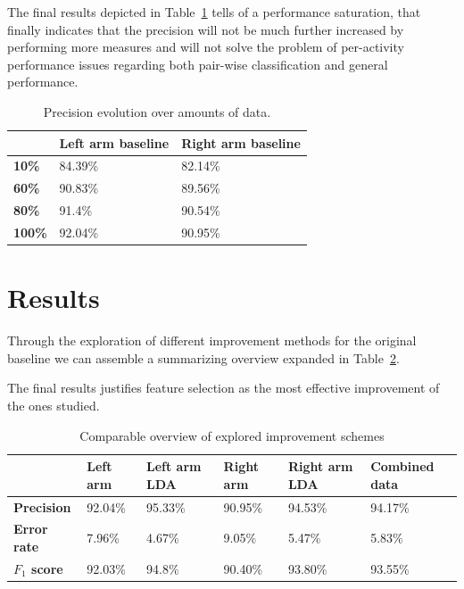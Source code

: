 \documentclass{sig-alternate}
\begin{document}
The final results depicted in Table~\ref{tab:evo_prec} tells of a performance saturation, that finally indicates that the precision will not be much further increased by performing more measures and will not solve the problem of per-activity performance issues regarding both pair-wise classification and general performance.

\begin{table}[t]
\centering
\caption{Precision evolution over amounts of data.}
\begin{tabular}{|l|l|l|}
\hline
           					&\textbf{Left arm baseline} 	&\textbf{Right arm baseline}		\\ \hline
\textbf{10\%}  				& 84.39\% 		 				& 82.14\%							\\ \hline
\textbf{60\%} 				& 90.83\%		 				& 89.56\%							\\ \hline
\textbf{80\%}  				& 91.4\%		 				& 90.54\%							\\ \hline
\textbf{100\%}  			& 92.04\% 		 				& 90.95\%							\\ \hline

\end{tabular}
\label{tab:evo_prec}
\end{table}


\section{Results}
Through the exploration of different improvement methods for the original baseline we can assemble a summarizing overview expanded in Table~\ref{tab:results}.

The final results justifies feature selection as the most effective improvement of the ones studied.

\begin{table}[bp]
\centering
\caption{Comparable overview of explored improvement schemes}
\begin{tabular}{|l|l|l|l|l|l|}
\hline
           							&\textbf{Left arm} 			&\textbf{Left arm LDA}		&\textbf{Right arm}		&\textbf{Right arm LDA}		&\textbf{Combined data}	\\ \hline
\textbf{Precision}  				& 92.04\% 		 			& 95.33\%					& 90.95\%				& 94.53\%					& 94.17\%				\\ \hline
\textbf{Error rate} 				& 7.96\%		 			& 4.67\%					& 9.05\%				& 5.47\%					& 5.83\%				\\ \hline
\textbf{$F_{1}$ score}  			& 92.03\%		 			& 94.8\%					& 90.40\%				& 93.80\%					& 93.55\%			\\ \hline
\end{tabular}
\label{tab:results}
\end{table}
\end{document}
